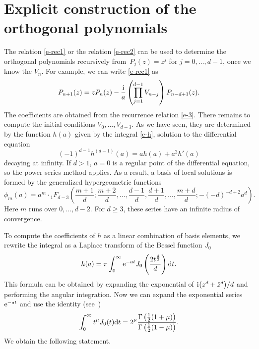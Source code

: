 \documentclass[10pt,a4paper]{amsart}
\numberwithin{equation}{section}
\theoremstyle{definition}
\begin{document}
\section{Explicit construction of the orthogonal polynomials}\label{s-4}
The relation \eqref{e-rec1} or the relation \eqref{e-rec2} can be used to determine the orthogonal
polynomials recursively from~${P_j(z)=z^j}$ for $j=0,\dots,d-1$, once we know the $V_n$.
For example, we can write \eqref{e-rec1} as
\begin{equation}\label{e-3tr}
 P_{n+1}(z)=zP_n(z)-\frac {\rm i}a\left(\prod_{j=1}^{d-1}V_{n-j}\right) P_{n-d+1}(z).
\end{equation}
The coefficients are obtained from the recurrence relation \eqref{e-3}. There remains to compute the initial conditions $V_0,\dots,V_{d-3}$. As we have seen, they are determined by the function $h(a)$ given by the integral \eqref{e-h}, solution to the differential equation
\[
(-1)^{d-1}h^{(d-1)}(a)=a h(a)+a^2h'(a)
\]
decaying at infinity. If $d>1$, $a=0$ is a regular point of the differential equation, so the power series method applies. As a result, a basis of local solutions is formed by the generalized hypergeometric functions{\samepage
\begin{equation}\label{e-Bob}
 \phi_m(a)=a^m\cdot {}_1F_{d-3}\left({\frac{m+1}d;
 \frac{m+2}{d},\dots,\frac{d-1}{d},\frac{d+1}{d},\dots, \frac{m+d}{d}};-
 (-d)^{-d+2}a^d\right).
\end{equation}
Here $m$ runs over $0,\dots,d-2$. For $d\geq3$, these series have an infinite radius of convergence.}

To compute the coefficients of $h$ as a linear combination of basis elements, we rewrite the integral as a Laplace transform of the Bessel function $J_0$
\[
 h(a)=\pi\int_0^\infty {\rm e}^{-a t} J_0\left(\frac{2t^\frac d2}{d}\right){\rm d}t.
\]
This formula can be obtained by expanding the exponential of ${\rm i}\bigl(z^d+\bar z^d\bigr)/d$ and performing the angular integration. Now we can expand the exponential series ${\rm e}^{-at}$ and use the identity (see~\cite[formula~(10.22.43)]{NIST:DLMF})
\[
 \int_0^\infty t^\mu J_0(t){\rm d}t=2^\mu
 \frac{\Gamma\left(\frac12(1+\mu)\right)}{\Gamma\left(\frac12(1-\mu)
 \right)}.
\]
We obtain the following statement.
\end{document}
